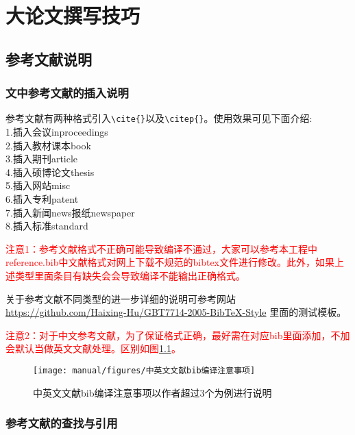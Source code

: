 \chapter{大论文撰写技巧}

\section{参考文献说明}
\subsection{文中参考文献的插入说明}
参考文献有两种格式引入\verb+\cite{}+以及\verb+\citep{}+。使用效果可见下面介绍:\\
1.插入会议inproceedings\\
2.插入教材课本book\\
3.插入期刊article\\
4.插入硕博论文thesis\\
5.插入网站misc\\
6.插入专利patent\\
7.插入新闻news报纸newspaper\\
8.插入标准standard

\textcolor{red}{注意1：参考文献格式不正确可能导致编译不通过，大家可以参考本工程中reference.bib中文献格式对网上下载不规范的bibtex文件进行修改。此外，如果上述类型里面条目有缺失会会导致编译不能输出正确格式。}

关于参考文献不同类型的进一步详细的说明可参考网站\url{https://github.com/Haixing-Hu/GBT7714-2005-BibTeX-Style}
里面的测试模板。


\textcolor{red}{注意2：对于中文参考文献，为了保证格式正确，最好需在对应bib里面添加，不加会默认当做英文文献处理。区别如图\ref{fig_bib0}。}

\begin{figure}[!htb]
  \centering
  \texttt{[image: manual/figures/中英文文献bib编译注意事项]}
  \caption{中英文文献bib编译注意事项以作者超过3个为例进行说明}
  \label{fig_bib0}
\end{figure}

\subsection{参考文献的查找与引用}


